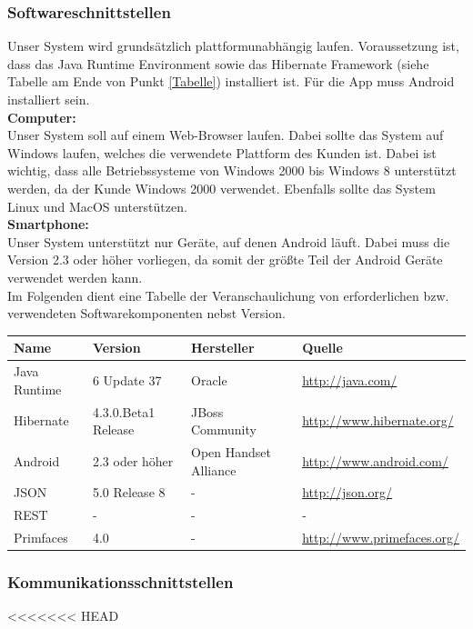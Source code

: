\documentclass[fontsize=12pt,paper=a4,twoside]{scrartcl}
\begin{document}
\subsubsection{Softwareschnittstellen} \label{software}

Unser System wird grundsätzlich plattformunabhängig laufen. Voraussetzung ist, dass das Java Runtime 
Environment sowie das Hibernate Framework (siehe Tabelle am Ende von Punkt \ref{Tabelle}) installiert 
ist. Für die App muss Android installiert sein. \\

   \textbf{Computer:}\\
  Unser System soll auf einem Web-Browser laufen. Dabei sollte das System auf Windows laufen, welches 
  die verwendete Plattform des Kunden ist. Dabei ist wichtig, dass alle Betriebssysteme von Windows 
  2000 bis Windows 8 unterstützt werden, da der Kunde Windows 2000 verwendet. Ebenfalls sollte das 
  System Linux und MacOS unterstützen. \\
  
  \textbf{Smartphone:}\\
  Unser System unterstützt nur Geräte, auf denen Android läuft. Dabei muss  die Version 2.3 oder höher 
  vorliegen, da somit der größte Teil der Android Geräte verwendet werden kann.\\
Im Folgenden dient eine Tabelle der Veranschaulichung von erforderlichen bzw. verwendeten Softwarekomponenten nebst 
Version.  \\ 

\label{Tabelle}
  \begin{tabular}{|l|l|l|l|}\hline
    \textbf{Name} & \textbf{Version} & \textbf{Hersteller} & \textbf{Quelle} \\\hline
    Java Runtime & 6 Update 37 & Oracle & \url{http://java.com/} \\\hline
    Hibernate & 4.3.0.Beta1 Release& JBoss Community &  
   \url{http://www.hibernate.org/}\\\hline
    Android & 2.3 oder höher & Open Handset Alliance & \url{http://www.android.com/} \\\hline
    JSON & 5.0 Release 8 & - & \url{http://json.org/} \\\hline
    REST & - & - & - \\\hline
    Primfaces & 4.0 & - & \url{http://www.primefaces.org/} \\\hline
  \end{tabular}
  

\subsubsection{Kommunikationsschnittstellen}
<<<<<<< HEAD
\end{document}
